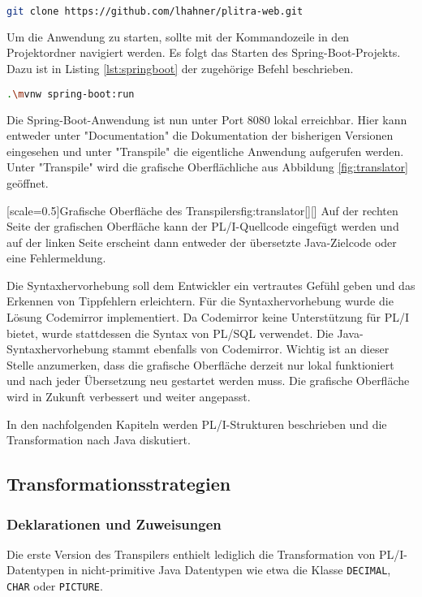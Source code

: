 \begin{lstlisting}[language=bash, caption=Klonen des Repositories der Webschnittstelle, label={lst:gitcloneweb}]
	git clone https://github.com/lhahner/plitra-web.git
\end{lstlisting}

Um die Anwendung zu starten, sollte mit der Kommandozeile in den Projektordner navigiert werden.
Es folgt das Starten des Spring-Boot-Projekts. Dazu ist in Listing \ref{lst:springboot} der zugehörige Befehl beschrieben.

\begin{lstlisting}[language=bash, caption=Build Spring-Boot Projekt, label={lst:springboot}]
	.\mvnw spring-boot:run
\end{lstlisting}

Die Spring-Boot-Anwendung ist nun unter Port 8080 lokal erreichbar.
Hier kann entweder unter "Documentation" die Dokumentation der bisherigen Versionen eingesehen und unter "Transpile"
die eigentliche Anwendung aufgerufen werden.
Unter "Transpile" wird die grafische Oberflächliche aus Abbildung \ref{fig:translator} geöffnet.

[scale=0.5]{Grafische Oberfläche des Transpilers}{fig:translator}[][]
\pagebreak
Auf der rechten Seite der grafischen Oberfläche kann der PL/I-Quellcode eingefügt werden und auf der linken Seite erscheint dann entweder der übersetzte Java-Zielcode oder eine Fehlermeldung.

Die Syntaxhervorhebung soll dem Entwickler ein vertrautes Gefühl geben und das Erkennen von Tippfehlern erleichtern.
Für die Syntaxhervorhebung wurde die Lösung Codemirror implementiert. Da Codemirror keine Unterstützung für PL/I bietet, wurde stattdessen die Syntax von PL/SQL verwendet. Die Java-Syntaxhervorhebung stammt ebenfalls von Codemirror. Wichtig ist an dieser Stelle anzumerken, dass die grafische Oberfläche derzeit nur lokal funktioniert und nach jeder Übersetzung neu gestartet werden muss. Die grafische Oberfläche wird in Zukunft verbessert und weiter angepasst.

In den nachfolgenden Kapiteln werden PL/I-Strukturen beschrieben und die Transformation nach Java diskutiert.
\pagebreak

\subsection{Transformationsstrategien}
\subsubsection{Deklarationen und Zuweisungen}
Die erste Version des Transpilers enthielt lediglich die Transformation von PL/I-Datentypen in nicht-primitive Java Datentypen wie etwa die Klasse \verb+DECIMAL+, \verb+CHAR+ oder \verb+PICTURE+.

